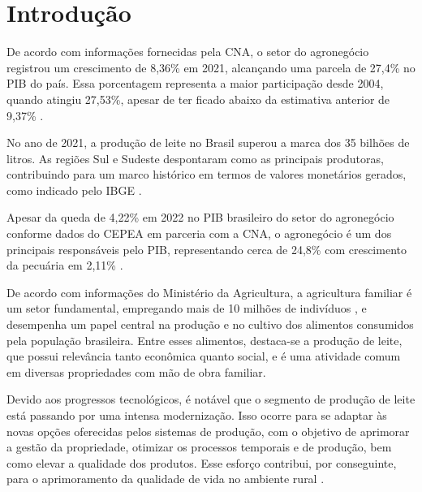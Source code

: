 
\chapter{Introdução}\label{cap:introducao}
De acordo com informações fornecidas pela \gls{CNA}, o setor do agronegócio registrou um crescimento de 8,36\% em 2021, alcançando uma parcela de 27,4\% no \gls{PIB} do país. Essa porcentagem representa a maior participação desde 2004, quando atingiu 27,53\%, apesar de ter ficado abaixo da estimativa anterior de 9,37\% \cite{CNA:2021:PesquisaPecuariaMunicipal2020}.

No ano de 2021, a produção de leite no Brasil superou a marca dos 35 bilhões de litros. As regiões Sul e Sudeste despontaram como as principais produtoras, contribuindo para um marco histórico em termos de valores monetários gerados, como indicado pelo \gls{IBGE} \cite{IBGE:2021:ProducaoAgropecuaria}.

Apesar da queda de 4,22\% em 2022 no \gls{PIB} brasileiro do setor do agronegócio conforme dados do \gls{CEPEA} em parceria com a \gls{CNA}, o agronegócio é um dos principais responsáveis pelo \gls{PIB}, representando cerca de 24,8\% com crescimento da pecuária em 2,11\% \cite{CEPEA:2023:PIBAgronegocio}.

De acordo com informações do Ministério da Agricultura, a agricultura familiar é um setor fundamental, empregando mais de 10 milhões de indivíduos \cite{MDA:2019:AgriculturaFamiliar}, e desempenha um papel central na produção e no cultivo dos alimentos consumidos pela população brasileira. Entre esses alimentos, destaca-se a produção de leite, que possui relevância tanto econômica quanto social, e é uma atividade comum em diversas propriedades com mão de obra familiar.

Devido aos progressos tecnológicos, é notável que o segmento de produção de leite está passando por uma intensa modernização. Isso ocorre para se adaptar às novas opções oferecidas pelos sistemas de produção, com o objetivo de aprimorar a gestão da propriedade, otimizar os processos temporais e de produção, bem como elevar a qualidade dos produtos. Esse esforço contribui, por conseguinte, para o aprimoramento da qualidade de vida no ambiente rural \cite{Botega:JVL:2007:DiagnosticoAutomacaoProducaoLeiteira}.


